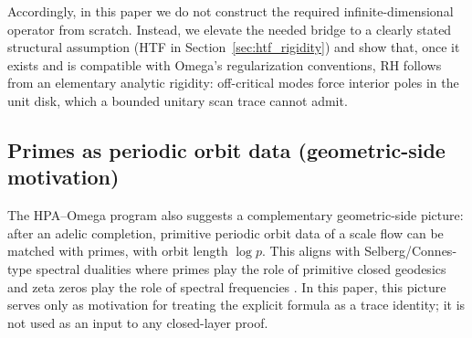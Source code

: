 Accordingly, in this paper we do not construct the required infinite-dimensional operator from scratch.
Instead, we elevate the needed bridge to a clearly stated structural assumption (HTF in Section~\ref{sec:htf_rigidity}) and show that, once it exists and is compatible with Omega's regularization conventions, RH follows from an elementary analytic rigidity: off-critical modes force interior poles in the unit disk, which a bounded unitary scan trace cannot admit.

\subsection{Primes as periodic orbit data (geometric-side motivation)}
\label{sec:primes_periodic_orbits}

The HPA--Omega program also suggests a complementary geometric-side picture: after an adelic completion, primitive periodic orbit data of a scale flow can be matched with primes, with orbit length $\log p$.
This aligns with Selberg/Connes-type spectral dualities where primes play the role of primitive closed geodesics and zeta zeros play the role of spectral frequencies \cite{Connes1999}.
In this paper, this picture serves only as motivation for treating the explicit formula as a trace identity; it is not used as an input to any closed-layer proof.



